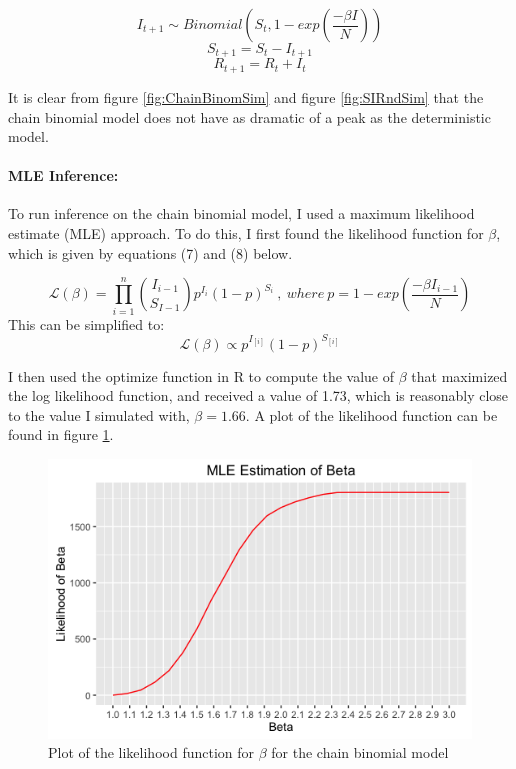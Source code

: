 \documentclass{article}
\begin{document}
\begin{equation} 
I_{t+1} \sim Binomial(S_{t}, 1-exp(\frac{-\beta I}{N})) 
\end{equation}
\begin{equation} 
S_{t+1} = S_{t} - I_{t+1} 
\end{equation}
\begin{equation}
R_{t+1} = R_{t} + I_{t}
\end{equation}

It is clear from figure \ref{fig:ChainBinomSim} and figure \ref{fig:SIRndSim} that the chain binomial model does not have as dramatic of a peak as the deterministic model. 


\paragraph{MLE Inference:}
To run inference on the chain binomial model, I used a maximum likelihood estimate (MLE) approach. To do this, I first found the likelihood function for $\beta$, which is given by equations (7) and (8) below. 


\begin{equation}
\mathcal{L}(\beta) =  \prod_{i=1}^n {I_{i-1}\choose S_{I-1}} p^{I_{i}}(1-p)^{S_{i}}
~, ~where ~ p = 1-exp(\frac{-\beta I_{i-1}}{N})
\end{equation}
This can be simplified to:
\begin{equation}
\mathcal{L}(\beta) \propto p^{I_{[i]}}(1-p)^{S_{[i]}}
\end{equation}

I then used the optimize function in R to compute the value of $\beta$ that maximized the log likelihood function, and received a value of 1.73, which is reasonably close to the value I simulated with, $\beta=1.66$. A plot of the likelihood function can be found in figure \ref{fig:ChainBinomMLE}.

\begin{figure}[htbp]
\includegraphics[scale=.5, center]{ChainBinomMLE.png}
\caption{Plot of the likelihood function for $\beta$ for the chain binomial model}
\label{fig:ChainBinomMLE}
\end{figure}
\end{document}
